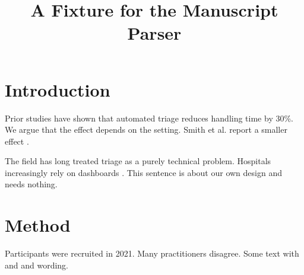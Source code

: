\documentclass{article}
\begin{document}
\title{A Fixture for the Manuscript Parser}
\maketitle

\section{Introduction}

Prior studies have shown that automated triage reduces handling time by 30\%. We argue that the effect depends on the setting. Smith et al. report a smaller effect \citep[p.~4]{Smith2020}. 

The field has long treated triage as a purely technical problem. 
Hospitals increasingly rely on dashboards . This sentence is about our own design and needs nothing.



\section{Method}

Participants were recruited in 2021. Many practitioners \cite{} disagree. Some text with  and  and  wording. 
\begin{table}[t]
\caption{Reviews have shown many things without a citation}
\end{table}


\end{document}
